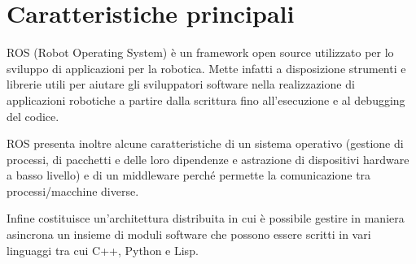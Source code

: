 \documentclass[Lau, binding=0.6cm, twoside]{sapthesis}
\begin{document}
\section{Caratteristiche principali}
ROS (Robot Operating System) è un framework open source utilizzato per lo sviluppo di applicazioni per la robotica.
Mette infatti a disposizione strumenti e librerie utili per aiutare gli sviluppatori software nella realizzazione di applicazioni robotiche a partire dalla scrittura fino all’esecuzione e al debugging del codice.

ROS presenta inoltre alcune caratteristiche di un sistema operativo (gestione di processi, di pacchetti e delle loro dipendenze e astrazione di dispositivi hardware a basso livello) e di un middleware perché permette la comunicazione tra processi/macchine diverse.

Infine costituisce un’architettura distribuita in cui è possibile gestire in maniera asincrona un insieme di moduli software che possono essere scritti in vari linguaggi tra cui C++, Python e Lisp.
\end{document}
